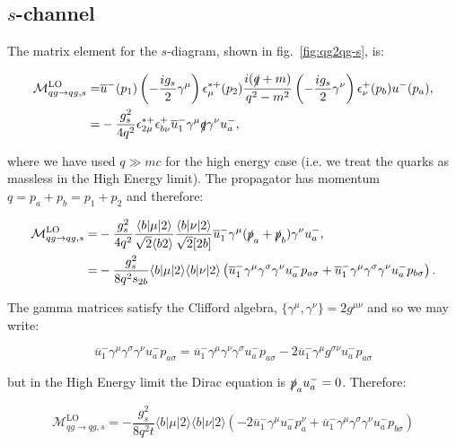		\subsection{$s$-channel}

			The matrix element for the $s$-diagram, shown in fig.~\eqref{fig:qg2qg-s}, is:

			\begin{align}
				\mathcal{M}_{qg\rightarrow qg, s}^{\text{LO}}=&\overline{u}^-(p_1)\left(-\frac{ig_s}{2}\gamma^\mu\right)\epsilon_\mu^{*+}(p_2)
					\frac{i(\slashed q+m)}{q^2-m^2}\left(-\frac{ig_s}{2}\gamma^\nu\right)\epsilon^+_\nu(p_b)u^-(p_a), \\
				=&-\frac{g^2_s}{4q^2}\epsilon^{*+}_{2\mu}\epsilon^+_{b\nu}\overline{u}^-_1\gamma^\mu\slashed q\gamma^\nu u^-_a,
			\end{align}

			where we have used $q\gg mc$ for the high energy case (i.e. we treat the quarks as massless in the High Energy limit).
			The propagator has momentum $q=p_a+p_b=p_1+p_2$ and therefore:

			\begin{align}
				\mathcal{M}_{qg\rightarrow qg, s}^{\text{LO}}=&-\frac{g^2_s}{4q^2}\frac{\langle{b}|\mu|2\rangle}{\sqrt{2}\langle{b2\rangle}}
				\frac{\langle{b}|\nu|2\rangle}{\sqrt{2}[2b]}\overline{u}^-_1\gamma^\mu(\slashed{p}_a+\slashed{p}_b)\gamma^\nu u^-_a,\\
				=&-\frac{g^2_s}{8q^2s_{2b}}\langle{b}|\mu|2\rangle\langle{b}|\nu|2\rangle
				\left(\overline{u}^-_1\gamma^\mu\gamma^\sigma\gamma^\nu u^-_ap_{a\sigma}+
				\overline{u}^-_1\gamma^\mu\gamma^\sigma\gamma^\nu u^-_ap_{b\sigma}\right).
			\end{align}

			The gamma matrices satisfy the Clifford algebra, $\{\gamma^\mu, \gamma^\nu\}=2g^{\mu\nu}$ and so we may write:

			\begin{equation}
				\overline{u}^-_1\gamma^\mu\gamma^\sigma\gamma^\nu u^-_ap_{a\sigma}=
				\overline{u}^-_1\gamma^\mu\gamma^\nu\gamma^\sigma u^-_ap_{a\sigma} -
				2\overline{u}^-_1\gamma^\mu g^{\sigma\nu}u^-_ap_{a\sigma}
			\end{equation}

			but in the High Energy limit the Dirac equation is $\slashed{p}_au^-_a=0$. Therefore:

			\begin{equation}
				\mathcal{M}_{qg\rightarrow qg, s}^{\text{LO}}=-\frac{g^2_s}{8q^2t}\langle{b}|\mu|2\rangle\langle{b}|\nu|2\rangle
				\left(-2\overline{u}^-_1\gamma^\mu u^-_ap_{a}^\nu+\overline{u}^-_1\gamma^\mu\gamma^\sigma\gamma^\nu u^-_ap_{b\sigma}\right)
			\end{equation}

